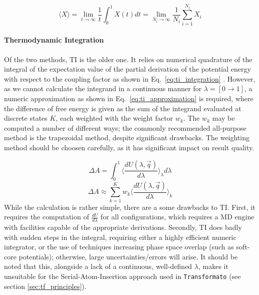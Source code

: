 \documentclass[oneside]{scrreprt}
\begin{document}
\begin{equation}\label{eq:expectvalue}
\langle X \rangle = \lim_{t\rightarrow\infty}\frac{1}{t} \int_0^1 X (t) dt = \lim_{N_i\to\infty} \frac{1}{N_i}\sum_{i=1}^{N_i} X_i
\end{equation}



\paragraph{Thermodynamic Integration} Of the two methods, TI is  the older one. It relies on numerical quadrature of the integral of the expectation value of the partial derivation of the potential energy with respect to the coupling factor as shown in Eq.~\ref{eq:ti_integration} \cite{boresch_efficiency_2011}. However, as we cannot calculate the integrand in a continuous manner for $\lambda =[0\rightarrow1]$, a numeric approximation as shown in Eq.~\ref{eq:ti_approximation} is required, where the difference of free energy is given as the sum of the integrand evaluated at discrete states $K$, each weighted with the weight factor $w_k$. The $w_k$ may be computed a number of different ways; the commonly recommended all-purpose method is the trapezoidal method, despite significant drawbacks\cite{mey_best_2020,boresch_efficiency_2011}. The weighting method should be choosen carefully, as it has significant impact on result quality.

\begin{equation} \label{eq:ti_integration}
    \Delta A=\int_0^1 \biggl \langle\frac{dU(\lambda,\Vec{q})}{d\lambda} \biggr \rangle_{\lambda} d\lambda 
\end{equation}
\begin{equation} \label{eq:ti_approximation}
    \Delta A \approx \sum_{k=1}^K w_k \biggl \langle\frac{dU(\lambda,\Vec{q})}{d\lambda} \biggr \rangle_{k}
\end{equation}
While the calculation is rather simple, there are a some drawbacks to TI. First, it requires the computation of $\frac{dU}{d\lambda}$ for all configurations, which requires a MD engine with facilities capable of the appropriate derivations. Secondly, TI does badly with sudden steps in the integral, requiring either a highly efficient numeric integrator, or the use of techniques increasing phase space overlap (such as soft-core potentials); otherwise, large uncertainties/errors will arise. It should be noted that this, alongside a lack of a continuous, well-defined $\lambda$, makes it unsuitable for the Serial-Atom-Insertion approach used in \texttt{Transformato} (see section \ref{sec:tf_principles}).
\end{document}
